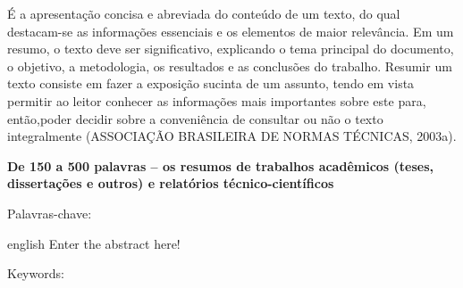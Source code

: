 \begin{resumo}
  \vspace{-15pt}
  
  É a apresentação concisa e abreviada do conteúdo de um texto, do qual destacam-se as informações essenciais e os elementos de maior relevância. Em um resumo, o texto deve ser significativo, explicando o tema principal do documento, o objetivo, a metodologia, os resultados e as conclusões do trabalho. Resumir um texto consiste em fazer a exposição sucinta de um assunto, tendo em vista permitir ao leitor conhecer as informações mais importantes sobre este para, então,poder decidir sobre a conveniência de consultar ou não o texto integralmente (ASSOCIAÇÃO BRASILEIRA DE NORMAS TÉCNICAS, 2003a).

  \textbf{De 150 a 500 palavras – os resumos de trabalhos acadêmicos (teses, dissertações e outros) e relatórios técnico-científicos}

  Palavras-chave: \palavraschaveemlinha
\end{resumo}


\begin{resumo}[Abstract]
  \vspace{-15pt}
  
  \begin{otherlanguage*}{english}
  Enter the abstract here!
  
  Keywords: \inlinekeywords
\end{otherlanguage*}
\end{resumo}